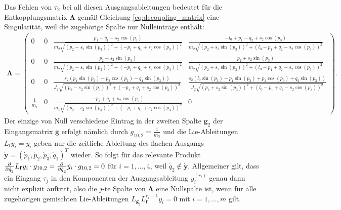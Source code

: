 Das Fehlen von $\tau_2$ bei all diesen Ausgangsableitungen bedeutet für die Entkopplungsmatrix $\boldsymbol{\Lambda}$ gemäß Gleichung \eqref{eq:decoupling_matrix} eine Singularität, weil die zugehörige Spalte nur Nulleinträge enthält:
\begin{align}
\label{eq:Lambda_double_crane}
	\boldsymbol{\Lambda} = 
	\left(\begin{smallmatrix}
		0 & 0 & \frac{p_{1} - q_{1} - s_{2} \cos{\left(p_{3} \right)}}{m_{2} \sqrt{\left(p_{2} - s_{2} \sin{\left(p_{3} \right)}\right)^{2} + \left(- p_{1} + q_{1} + s_{2} \cos{\left(p_{3} \right)}\right)^{2}}} & \frac{- l_{0} + p_{1} - q_{2} + s_{2} \cos{\left(p_{3} \right)}}{m_{2} \sqrt{\left(p_{2} + s_{2} \sin{\left(p_{3} \right)}\right)^{2} + \left(l_{0} - p_{1} + q_{2} - s_{2} \cos{\left(p_{3} \right)}\right)^{2}}}\\
		0 & 0 & \frac{p_{2} - s_{2} \sin{\left(p_{3} \right)}}{m_{2} \sqrt{\left(p_{2} - s_{2} \sin{\left(p_{3} \right)}\right)^{2} + \left(- p_{1} + q_{1} + s_{2} \cos{\left(p_{3} \right)}\right)^{2}}} & \frac{p_{2} + s_{2} \sin{\left(p_{3} \right)}}{m_{2} \sqrt{\left(p_{2} + s_{2} \sin{\left(p_{3} \right)}\right)^{2} + \left(l_{0} - p_{1} + q_{2} - s_{2} \cos{\left(p_{3} \right)}\right)^{2}}}\\
		0 & 0 & \frac{s_{2} \left(p_{1} \sin{\left(p_{3} \right)} - p_{2} \cos{\left(p_{3} \right)} - q_{1} \sin{\left(p_{3} \right)}\right)}{J_{2} \sqrt{\left(p_{2} - s_{2} \sin{\left(p_{3} \right)}\right)^{2} + \left(- p_{1} + q_{1} + s_{2} \cos{\left(p_{3} \right)}\right)^{2}}} & \frac{s_{2} \left(l_{0} \sin{\left(p_{3} \right)} - p_{1} \sin{\left(p_{3} \right)} + p_{2} \cos{\left(p_{3} \right)} + q_{2} \sin{\left(p_{3} \right)}\right)}{J_{2} \sqrt{\left(p_{2} + s_{2} \sin{\left(p_{3} \right)}\right)^{2} + \left(l_{0} - p_{1} + q_{2} - s_{2} \cos{\left(p_{3} \right)}\right)^{2}}}\\
		\frac{1}{m_{1}} & 0 & \frac{- p_{1} + q_{1} + s_{2} \cos{\left(p_{3} \right)}}{m_{1} \sqrt{\left(p_{2} - s_{2} \sin{\left(p_{3} \right)}\right)^{2} + \left(- p_{1} + q_{1} + s_{2} \cos{\left(p_{3} \right)}\right)^{2}}} & 0
	\end{smallmatrix}\right) .
\end{align}
Der einzige von Null verschiedene Eintrag in der zweiten Spalte $\mathbf{g}_2$ der Eingangsmatrix $\mathbf{g}$ erfolgt nämlich durch $g_{10, 2} = \frac{1}{m_3}$ und die Lie-Ableitungen $L_{\mathbf{f}} y_i = \dot{y}_i$ geben nur die zeitliche Ableitung des flachen Ausgangs $\dot{\mathbf{y}} = (\dot{p}_1, \dot{p}_2, \dot{p}_3, \dot{q}_1)^T$ wieder. So folgt für das relevante Produkt $\frac{\partial^{}}{\partial{\dot{q}_2}^{}} L_{\mathbf{f}} y_i \cdot g_{10, 2} = \frac{\partial^{}}{\partial{\dot{q}_2}^{}} \dot{y}_i \cdot g_{10, 2} = 0$ für $i = 1,..., 4$, weil $\dot{q}_2 \not\in \dot{\mathbf{y}}$. Allgemeiner gilt, dass ein Eingang $\tau_j$ in den Komponenten der Ausgangsableitung $y_i^{(r_i)}$ genau dann nicht explizit auftritt, also die $j$-te Spalte von $\boldsymbol{\Lambda}$ eine Nullspalte ist, wenn für alle zugehörigen gemischten Lie-Ableitungen $L_{\mathbf{g}_j} L_{\mathbf{f}}^{r_i-1} y_i = 0$ mit $i = 1, ..., m$ gilt. \cite[S. 201]{NLRT_Roebenack}

